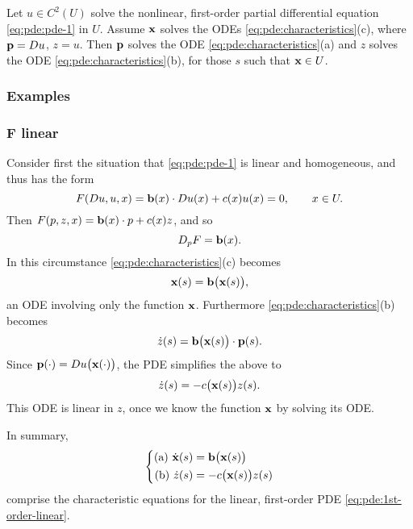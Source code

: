 \begin{theorem}
  Let \(u\in C^2(U)\) solve the nonlinear, first-order partial differential
  equation \eqref{eq:pde:pde-1} in \(U\). Assume \(\mathbf{x}\) solves the ODEs
  \eqref{eq:pde:characteristics}\textnormal{(c)}, where \(\mathbf{p}=Du\),
  \(z=u\). Then \(\mathbf{p}\) solves the ODE
  \eqref{eq:pde:characteristics}\textnormal{(a)} and \(z\) solves the ODE
  \eqref{eq:pde:characteristics}\textnormal{(b)}, for those \(s\) such that
  \(\mathbf{x}\in U\).
\end{theorem}
\subsubsection{Examples}
\subsubsection[\(F\) linear]{\(\bm F\)  linear}
Consider first the situation that \eqref{eq:pde:pde-1} is linear and
homogeneous, and thus has the form
\[
  F(Du,u,x)=\mathbf{b}(x)\cdot D u(x)+c(x)u(x)=0,\qquad x\in U.
\]
Then \(F(p,z,x)=\mathbf{b}(x)\cdot p+c(x)z\), and so
\[
  D_pF=\mathbf{b}(x).
\]
In this circumstance \eqref{eq:pde:characteristics}(c) becomes
\[
  \mathbf{x}(s)=\mathbf{b}\bigl(\mathbf{x}(s)\bigr),
\]
an ODE involving only the function \(\mathbf{x}\). Furthermore
\eqref{eq:pde:characteristics}(b) becomes
\begin{equation}
  \label{eq:pde:1st-order-linear}
  \dot z(s)=\mathbf{b}\bigl(\mathbf{x}(s)\bigr)\cdot\mathbf{p}(s).
\end{equation}
Since \(\mathbf{p}(\cdot)=Du\bigl(\mathbf{x}(\cdot)\bigr)\), the PDE simplifies the
above to
\[
  \dot z(s)=-c\bigl(\mathbf{x}(s)\bigr)z(s).
\]
This ODE is linear in \(z\), once we know the function \(\mathbf{x}\) by solving
its ODE.

In summary,
\begin{equation}
  \label{eq:pde:1st-order-linear-chars}
  \left\{
    \begin{aligned}
      \text{(a) }\dot{\mathbf{x}}(s)&=\mathbf{b}\bigl( \mathbf{x}(s) \bigr)\\
      \text{(b) }\dot z(s)&=-c\bigl(\mathbf{x}(s)\bigr)z(s)
    \end{aligned}
  \right.
\end{equation}
comprise the characteristic equations for the linear, first-order PDE
\eqref{eq:pde:1st-order-linear}.

